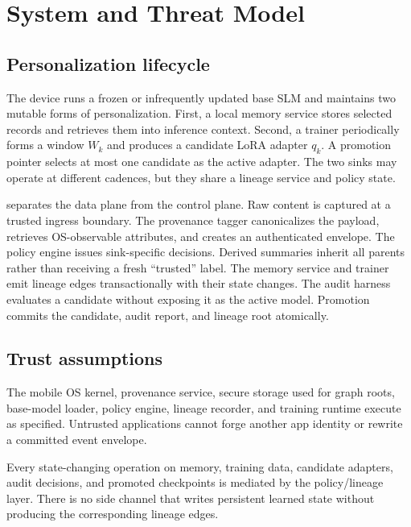 \section{System and Threat Model}
\label{sec:system}

\subsection{Personalization lifecycle}

The device runs a frozen or infrequently updated base SLM and maintains two mutable forms of personalization. First, a local memory service stores selected records and retrieves them into inference context. Second, a trainer periodically forms a window $W_k$ and produces a candidate LoRA adapter $q_k$. A promotion pointer selects at most one candidate as the active adapter. The two sinks may operate at different cadences, but they share a lineage service and policy state.

 separates the data plane from the control plane. Raw content is captured at a trusted ingress boundary. The provenance tagger canonicalizes the payload, retrieves OS-observable attributes, and creates an authenticated envelope. The policy engine issues sink-specific decisions. Derived summaries inherit all parents rather than receiving a fresh ``trusted'' label. The memory service and trainer emit lineage edges transactionally with their state changes. The audit harness evaluates a candidate without exposing it as the active model. Promotion commits the candidate, audit report, and lineage root atomically.

\subsection{Trust assumptions}

\begin{assumption}
\label{ass:tcb}
The mobile OS kernel, provenance service, secure storage used for graph roots, base-model loader, policy engine, lineage recorder, and training runtime execute as specified. Untrusted applications cannot forge another app identity or rewrite a committed event envelope.
\end{assumption}

\begin{assumption}
\label{ass:mediation}
Every state-changing operation on memory, training data, candidate adapters, audit decisions, and promoted checkpoints is mediated by the policy/lineage layer. There is no side channel that writes persistent learned state without producing the corresponding lineage edges.
\end{assumption}

